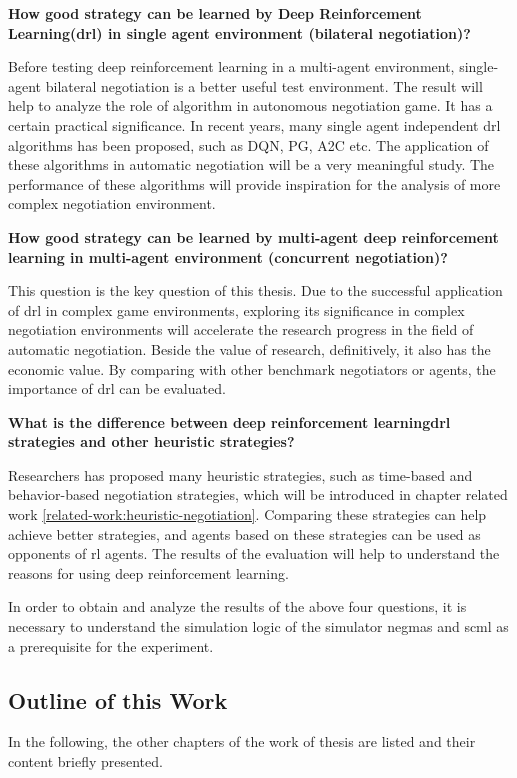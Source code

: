\textbf{How good strategy can be learned by Deep Reinforcement Learning(\gls{drl}) in single agent environment (bilateral negotiation)?}

Before testing deep reinforcement learning in a multi-agent environment, single-agent bilateral negotiation is a better useful test environment. The result will help to analyze the role of algorithm in autonomous negotiation game. It has a certain practical significance. In recent years, many single agent independent \gls{drl} algorithms has been proposed, such as DQN, PG, A2C etc. The application of these algorithms in automatic negotiation will be a very meaningful study. The performance of these algorithms will provide inspiration for the analysis of more complex negotiation environment.

\textbf{How good strategy can be learned by multi-agent deep reinforcement learning in multi-agent environment (concurrent negotiation)?}

This question is the key question of this thesis. Due to the successful application of \gls{drl} in complex game environments, exploring its significance in complex negotiation environments will accelerate the research progress in the field of automatic negotiation. Beside the value of research, definitively, it also has the economic value. By comparing with other benchmark negotiators or agents, the importance of \gls{drl} can be evaluated.

\textbf{What is the difference between deep reinforcement learning\gls{drl} strategies and other heuristic strategies?}

Researchers has proposed many heuristic strategies, such as time-based and behavior-based negotiation strategies, which will be introduced in chapter related work \ref{related-work:heuristic-negotiation}. Comparing these strategies can help achieve better strategies, and agents based on these strategies can be used as opponents of \gls{rl} agents. The results of the evaluation will help to understand the reasons for using deep reinforcement learning.

In order to obtain and analyze the results of the above four questions, it is necessary to understand the simulation logic of the simulator \gls{negmas} and \gls{scml} as a prerequisite for the experiment.

\subsection{Outline of this Work}
In the following, the other chapters of the work of thesis are listed and their content briefly presented.

